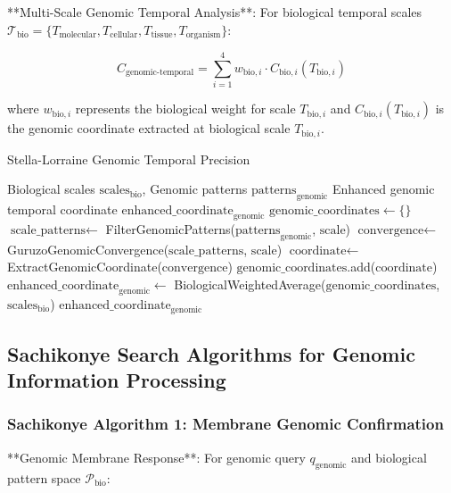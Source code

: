 \documentclass[12pt,a4paper]{article}
\begin{document}
**Multi-Scale Genomic Temporal Analysis**: For biological temporal scales $\mathcal{T}_{\text{bio}} = \{T_{\text{molecular}}, T_{\text{cellular}}, T_{\text{tissue}}, T_{\text{organism}}\}$:

\begin{equation}
C_{\text{genomic-temporal}} = \sum_{i=1}^{4} w_{\text{bio},i} \cdot C_{\text{bio},i}(T_{\text{bio},i})
\end{equation}

where $w_{\text{bio},i}$ represents the biological weight for scale $T_{\text{bio},i}$ and $C_{\text{bio},i}(T_{\text{bio},i})$ is the genomic coordinate extracted at biological scale $T_{\text{bio},i}$.

\begin{algorithm}
\caption{Stella-Lorraine Genomic Temporal Precision}
\begin{algorithmic}[1]
\Require Biological scales $\text{scales}_{\text{bio}}$, Genomic patterns $\text{patterns}_{\text{genomic}}$
\Ensure Enhanced genomic temporal coordinate $\text{enhanced\_coordinate}_{\text{genomic}}$
\State $\text{genomic\_coordinates} \leftarrow \{\}$
    \State $\text{scale\_patterns} \leftarrow$ FilterGenomicPatterns($\text{patterns}_{\text{genomic}}$, $\text{scale}$)
    \State $\text{convergence} \leftarrow$ GuruzoGenomicConvergence($\text{scale\_patterns}$, $\text{scale}$)
    \State $\text{coordinate} \leftarrow$ ExtractGenomicCoordinate($\text{convergence}$)
    \State $\text{genomic\_coordinates}$.add($\text{coordinate}$)
\EndFor
\State $\text{enhanced\_coordinate}_{\text{genomic}} \leftarrow$ BiologicalWeightedAverage($\text{genomic\_coordinates}$, $\text{scales}_{\text{bio}}$)
\Return $\text{enhanced\_coordinate}_{\text{genomic}}$
\end{algorithmic}
\end{algorithm}

\subsection{Sachikonye Search Algorithms for Genomic Information Processing}

\subsubsection{Sachikonye Algorithm 1: Membrane Genomic Confirmation}

**Genomic Membrane Response**: For genomic query $q_{\text{genomic}}$ and biological pattern space $\mathcal{P}_{\text{bio}}$:
\end{document}
